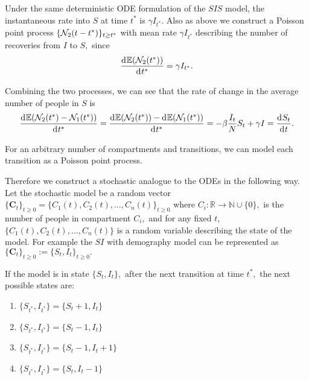 Under the same deterministic ODE formulation of the $SIS$ model,
the instantaneous
rate into $S$ at time $t^*$ is $\gamma I_{t^*}.$ Also as above we
construct a Poisson point process $\{\mathcal{N}_2(t - t^*)\}_{t\geq t^*}$ with
mean rate $\gamma I_{t^*}$ describing the number of recoveries from
$I$ to $S,$
since
$$\frac{\diff \E(\N_2(t^*))}{\diff t^*} = \gamma I_{t^*}.
$$

Combining the two processes, we can see that the rate of change in the
average number of people in $S$ is
$$
    \frac{\diff \E(\N_2(t^*) - \N_1(t^*))}{\diff t^*}
    = \frac{\diff \E(\N_2(t^*)) - \diff \E(\N_1(t^*))}{\diff t^*}
    = -\beta \frac{I_t}{N}S_t + \gamma I
    = \frac{\diff S_t}{\diff t}.
$$

For an arbitrary number of compartments and transitions, we can model each
transition as a Poisson point process.

Therefore we construct a stochastic analogue to the ODEs in the following way.
Let the stochastic model be a
random vector
$\{\mathbf{C}_t\}_{t\geq 0} = \{C_1(t), C_2(t), \dots, C_n(t)\}_{t\geq 0}$
where $C_i:\mathbb{R} \to \mathbb{N}\cup\{0\},$ is the number of people in
compartment $C_i,$ and for any fixed $t$, $\{C_1(t), C_2(t), \dots, C_n(t)\}$
is a random variable describing the state of the model. For example the $SI$
with demography model can be represented as
$\{\mathbf{C}_t\}_{t\geq 0}:=\{S_t, I_t\}_{t\geq 0}.$

If the model is in state $\{S_t, I_t\},$ after the next transition
at time $t^*,$ the next possible states are:
\begin{enumerate}
    \item $\{S_{t^*}, I_{t^*}\}=\{S_t + 1, I_t\}$ %
    \item $\{S_{t^*}, I_{t^*}\}=\{S_t - 1, I_t\}$ %
    \item $\{S_{t^*}, I_{t^*}\}=\{S_t - 1, I_t + 1\}$ %
    \item $\{S_{t^*}, I_{t^*}\}=\{S_t, I_t - 1\}$ %
\end{enumerate}

